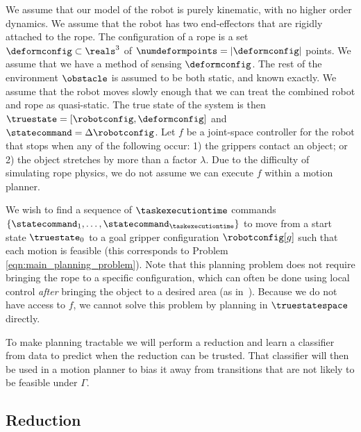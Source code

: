 We assume that our model of the robot is purely kinematic, with no higher order dynamics. We assume that the robot has two end-effectors that are rigidly attached to the rope. The configuration of a rope is a set $\deformconfig \subset \reals^3$ of $\numdeformpoints = | \deformconfig |$ points. We assume that we have a method of sensing $\deformconfig$. The rest of the environment $\obstacle$ is assumed to be both static, and known exactly. We assume that the robot moves slowly enough that we can treat the combined robot and rope as quasi-static. The true state of the system is then $\truestate = [\robotconfig,\deformconfig]$ and $\statecommand = \Delta \robotconfig$. Let $f$ be a joint-space controller for the robot that stops when any of the following occur: 1) the grippers contact an object; or 2) the object stretches by more than a factor $\lambda$. Due to the difficulty of simulating rope physics, we do not assume we can execute $f$ within a motion planner.

We wish to find a sequence of $\taskexecutiontime$ commands $\{\statecommand_1, \dots, \statecommand_{\taskexecutiontime} \}$ to move from a start state $\truestate_0$ to a goal gripper configuration $\robotconfig[g]$ such that each motion is feasible (this corresponds to Problem \eqref{eqn:main_planning_problem}). Note that this planning problem does not require bringing the rope to a specific configuration, which can often be done using local control \textit{after} bringing the object to a desired area (as in~\cite{McConachie2020}). %
Because we do not have access to $f$, we cannot solve this problem by planning in $\truestatespace$ directly.





To make planning tractable we will perform a reduction and learn a classifier from data to predict when the reduction can be trusted. That classifier will then be used in a motion planner to bias it away from transitions that are not likely to be feasible under $\Gamma$.


\subsection{Reduction}

